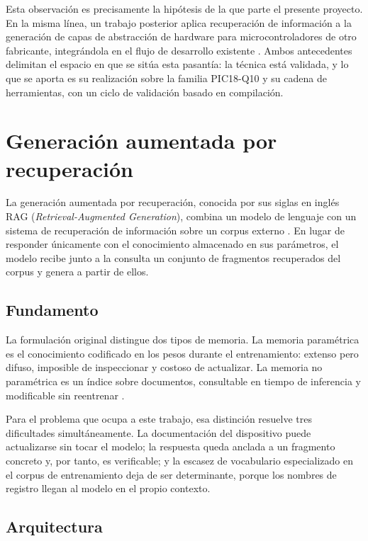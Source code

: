 Esta observación es precisamente la hipótesis de la que parte el presente
proyecto. En la misma línea, un trabajo posterior aplica recuperación de
información a la generación de capas de abstracción de hardware para
microcontroladores de otro fabricante, integrándola en el flujo de desarrollo
existente \cite{haug2025microcontrollers}. Ambos antecedentes delimitan el
espacio en que se sitúa esta pasantía: la técnica está validada, y lo que se
aporta es su realización sobre la familia PIC18-Q10 y su cadena de herramientas,
con un ciclo de validación basado en compilación.

\section{Generación aumentada por recuperación}

La generación aumentada por recuperación, conocida por sus siglas en inglés RAG
(\emph{Retrieval-Augmented Generation}), combina un modelo de lenguaje con un
sistema de recuperación de información sobre un corpus externo
\cite{lewis2020rag}. En lugar de responder únicamente con el conocimiento
almacenado en sus parámetros, el modelo recibe junto a la consulta un conjunto
de fragmentos recuperados del corpus y genera a partir de ellos.

\subsection{Fundamento}

La formulación original distingue dos tipos de memoria. La memoria paramétrica
es el conocimiento codificado en los pesos durante el entrenamiento: extenso
pero difuso, imposible de inspeccionar y costoso de actualizar. La memoria no
paramétrica es un índice sobre documentos, consultable en tiempo de inferencia y
modificable sin reentrenar \cite{lewis2020rag}.

Para el problema que ocupa a este trabajo, esa distinción resuelve tres
dificultades simultáneamente. La documentación del dispositivo puede
actualizarse sin tocar el modelo; la respuesta queda anclada a un fragmento
concreto y, por tanto, es verificable; y la escasez de vocabulario especializado
en el corpus de entrenamiento deja de ser determinante, porque los nombres de
registro llegan al modelo en el propio contexto.

\subsection{Arquitectura}

